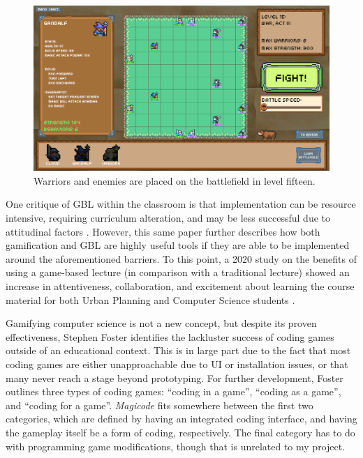 \documentclass[10pt,twocolumn]{article}
\begin{document}
\begin{figure}
    \centering
    \includegraphics[width=\linewidth]{images/screenshots/level_setup.png}
    \caption{Warriors and enemies are placed on the battlefield in level fifteen.}
    \label{fig:level-screenshot}
\end{figure}

One critique of GBL within the classroom is that implementation can be resource intensive, requiring curriculum alteration, and may be less successful due to attitudinal factors \cite{drivers-barriers}. However, this same paper further describes how both gamification and GBL are highly useful tools if they are able to be implemented around the aforementioned barriers. To this point, a 2020 study on the benefits of using a game-based lecture (in comparison with a traditional lecture) showed an increase in attentiveness, collaboration, and excitement about learning the course material for both Urban Planning and Computer Science students \cite{game-on-gbl}. 

Gamifying computer science is not a new concept, but despite its proven effectiveness, Stephen Foster \cite{coding-game-design} identifies the lackluster success of coding games outside of an educational context. This is in large part due to the fact that most coding games are either unapproachable due to UI or installation issues, or that many never reach a stage beyond prototyping. For further development, Foster outlines three types of coding games: “coding in a game”, “coding as a game”, and “coding for a game”. \textit{Magicode} fits somewhere between the first two categories, which are defined by having an integrated coding interface, and having the gameplay itself be a form of coding, respectively. The final category has to do with programming game modifications, though that is unrelated to my project.
\end{document}

